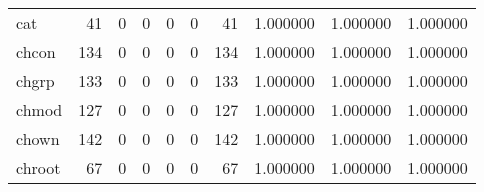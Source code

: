 \begin{longtable}{lrrrrrrrrr}
cat       &                                        41 &                                                  0 &                                                  0 &                                                  0 &                                                  0 &                                                 41 &                                           1.000000 &                               1.000000 &                             1.000000 \\
chcon     &                                       134 &                                                  0 &                                                  0 &                                                  0 &                                                  0 &                                                134 &                                           1.000000 &                               1.000000 &                             1.000000 \\
chgrp     &                                       133 &                                                  0 &                                                  0 &                                                  0 &                                                  0 &                                                133 &                                           1.000000 &                               1.000000 &                             1.000000 \\
chmod     &                                       127 &                                                  0 &                                                  0 &                                                  0 &                                                  0 &                                                127 &                                           1.000000 &                               1.000000 &                             1.000000 \\
chown     &                                       142 &                                                  0 &                                                  0 &                                                  0 &                                                  0 &                                                142 &                                           1.000000 &                               1.000000 &                             1.000000 \\
chroot    &                                        67 &                                                  0 &                                                  0 &                                                  0 &                                                  0 &                                                 67 &                                           1.000000 &                               1.000000 &                             1.000000 \\

\end{longtable}
